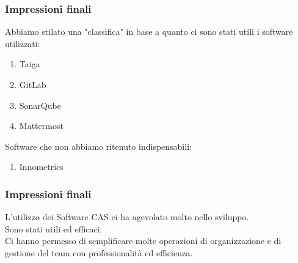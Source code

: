 \documentclass{beamer}
\begin{document}
\begin{frame}
\frametitle{Impressioni finali}
Abbiamo stilato una "classifica" in base a quanto ci sono stati utili i software utilizzati:
  \begin{enumerate}
	\item Taiga
	\item GitLab
	\item SonarQube
	\item Mattermost
  \end{enumerate}
  Software che non abbiamo ritenuto indispensabili:
  \begin{enumerate}
	\item Innometrics
  \end{enumerate}
\end{frame}

\begin{frame}
\frametitle{Impressioni finali}
L'utilizzo dei Software CAS ci ha agevolato molto nello sviluppo. \\
Sono stati utili ed efficaci.\\
Ci hanno permesso di semplificare molte operazioni di organizzazione e di gestione del team con professionalità ed efficienza.

\end{frame}
\end{document}
